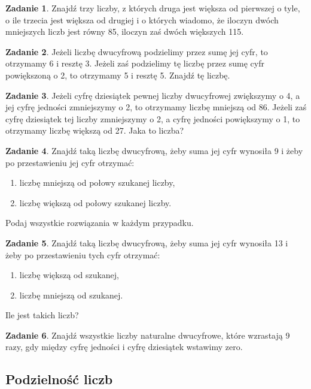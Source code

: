 \documentclass[11pt]{article}
\theoremstyle{definition}
\newtheorem{zad}{Zadanie}
\numberwithin{zad}{section}
\begin{document}
\begin{zad}
Znajdź trzy liczby, z których druga jest większa od pierwszej o tyle, o ile trzecia jest większa od drugiej i o których wiadomo, że iloczyn dwóch mniejszych liczb jest równy 85, iloczyn zaś dwóch większych 115.
\end{zad}

\begin{zad}
Jeżeli liczbę dwucyfrową podzielimy przez sumę jej cyfr, to otrzymamy 6 i resztę 3. Jeżeli zaś podzielimy tę liczbę przez sumę cyfr powiększoną o 2, to otrzymamy 5 i resztę 5. Znajdź tę liczbę.
\end{zad}

\begin{zad}
Jeżeli cyfrę dziesiątek pewnej liczby dwucyfrowej zwiększymy o 4, a jej cyfrę jedności zmniejszymy o 2, to otrzymamy liczbę mniejszą od 86. Jeżeli zaś cyfrę dziesiątek tej liczby zmniejszymy o 2, a cyfrę jedności powiększymy o 1, to otrzymamy liczbę większą od 27. Jaka to liczba?
\end{zad}

\begin{zad}
Znajdź taką liczbę dwucyfrową, żeby suma jej cyfr wynosiła 9 i żeby po przestawieniu jej cyfr otrzymać:
\begin{enumerate}
\item liczbę mniejszą od połowy szukanej liczby,
\item liczbę większą od połowy szukanej liczby.
\end{enumerate}
Podaj wszystkie rozwiązania w każdym przypadku.
\end{zad}

\begin{zad}
Znajdź taką liczbę dwucyfrową, żeby suma jej cyfr wynosiła 13 i żeby po przestawieniu tych cyfr otrzymać:
\begin{enumerate}
\item liczbę większą od szukanej,
\item liczbę mniejszą od szukanej.
\end{enumerate}
Ile jest takich liczb?
\end{zad}

\begin{zad}
Znajdź wszystkie liczby naturalne dwucyfrowe, które wzrastają 9 razy, gdy między cyfrę jedności i cyfrę dziesiątek wstawimy zero.
\end{zad}

\subsection{Podzielność liczb}
\end{document}
